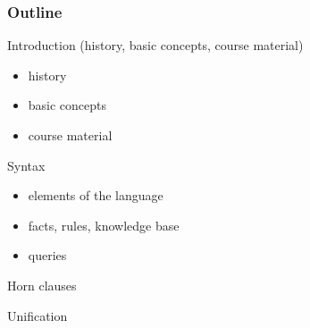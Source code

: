 \begin{frame}[t]
\frametitle{Outline}

Introduction (history, basic concepts, course material)
\begin{itemize}
\item history
\item basic concepts
\item course material
\end{itemize}
\bigskip

Syntax
\begin{itemize}
\item elements of the language
\item facts, rules, knowledge base
\item queries
\end{itemize}
\bigskip

Horn clauses
\bigskip

Unification

\end{frame}

